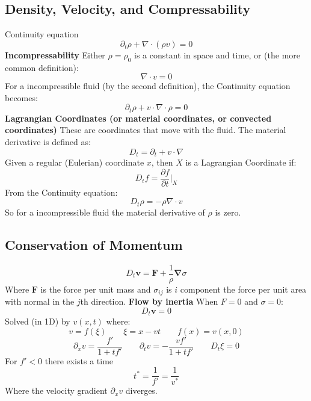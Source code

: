 \documentclass[twocolumn]{article}
\begin{document}
\subsection{Density, Velocity, and Compressability}
Continuity equation
\begin{equation}
    \partial_t\rho + \nabla\cdot(\rho v) = 0
\end{equation}
\textbf{Incompressability}
\newline
Either $\rho = \rho_0$ is a constant in space and time, or (the more common definition):
\begin{equation}
    \nabla\cdot v = 0
\end{equation}
For a incompressible fluid (by the second definition), the Continuity equation becomes:
\begin{equation}
    \partial_t\rho + v\cdot\nabla\cdot\rho = 0
\end{equation}
\textbf{Lagrangian Coordinates (or material coordinates, or convected coordinates)}
\newline
These are coordinates that move with the fluid. The material derivative is defined as:
\begin{equation}
    D_t = \partial_t + v\cdot\nabla
\end{equation}
Given a regular (Eulerian) coordinate $x$, then $X$ is a Lagrangian Coordinate if:
\begin{equation}
    D_t f = \frac{\partial f}{\partial t}\Bigg|_X
\end{equation}
From the Continuity equation:
\begin{equation}
    D_t \rho = -\rho \nabla \cdot v
\end{equation}
So for a incompressible fluid the material derivative of $\rho$ is zero.
\subsection{Conservation of Momentum}
\begin{equation}
    D_t \boldsymbol{v} = \boldsymbol{F} + \frac{1}{\rho}\boldsymbol{\nabla}\sigma
\end{equation}
Where $\boldsymbol{F}$ is the force per unit mass and $\sigma_{ij}$ is $i$ component the force per unit area with normal in the $j$th direction.
\newline
\textbf{Flow by inertia}
When $F = 0$ and $\sigma = 0$:
\begin{equation}
    D_t \boldsymbol{v} = 0
\end{equation}
Solved (in 1D) by $v(x, t)$ where:
\begin{equation}
    v = f(\xi)
    \qquad
    \xi = x - vt
    \qquad
    f(x) = v(x, 0)
\end{equation}
\begin{equation}
    \partial_x v = \frac{f'}{1+tf'}
    \qquad
    \partial_t v = -\frac{vf'}{1+tf'}
    \qquad
    D_t \xi = 0
\end{equation}
For $f' < 0$ there exists a time
\begin{equation}
    t^* = \frac{1}{f'} = \frac{1}{v^*}
\end{equation}
Where the velocity gradient $\partial_x v$ diverges.
\end{document}
